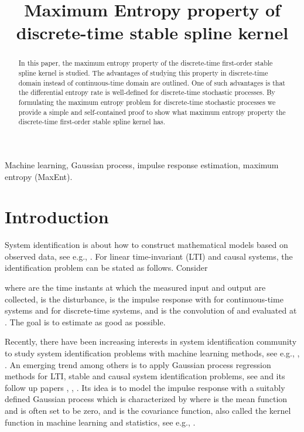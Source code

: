 \documentclass{article}
\title{Maximum Entropy property of discrete-time  stable spline kernel}
\begin{document}
\maketitle
\begin{abstract}
In this paper, the maximum entropy property of the discrete-time
first-order stable spline kernel is studied. The advantages of
studying this property in discrete-time domain instead of
continuous-time domain are outlined. One of such advantages is that
the differential entropy rate is well-defined for discrete-time
stochastic processes. By formulating the maximum entropy problem for
discrete-time stochastic processes we provide a simple and
self-contained proof to show what maximum entropy property
the discrete-time first-order stable spline kernel has.
\end{abstract}
\begin{keywords}
Machine learning, Gaussian process, impulse response estimation,
maximum entropy (MaxEnt).\end{keywords}
\section{Introduction}
\label{sec:intro} System identification is about how to construct
mathematical models based on observed data, see e.g.,
\cite{Ljung:99}. For linear time-invariant (LTI) and causal systems,
the identification problem can be stated as follows. Consider

where  are the time instants at which the
measured input  and output  are collected,  is the
disturbance,  is the impulse response with  for continuous-time systems and
 for discrete-time systems, and  is
the convolution of  and  evaluated at .
The goal is to estimate  as good as possible.



Recently, there have been increasing interests in system
identification community to study system identification problems
with machine learning methods, see e.g., \cite{LHO:11},
\cite{PDCDL14}. An emerging trend among others is to apply Gaussian
process regression methods for LTI, stable and causal system
identification problems, see \cite{PN10a} and its follow up papers
\cite{PCN11}, \cite{COL12a}, \cite{CACLP14}. Its idea is to model
the impulse response  with a suitably defined Gaussian process
which is characterized by where  is the mean function and is often set to be
zero, and  is the covariance function, also called the
kernel function in machine learning and statistics, see e.g.,
\cite{RasmussenW:06}.
\end{document}
